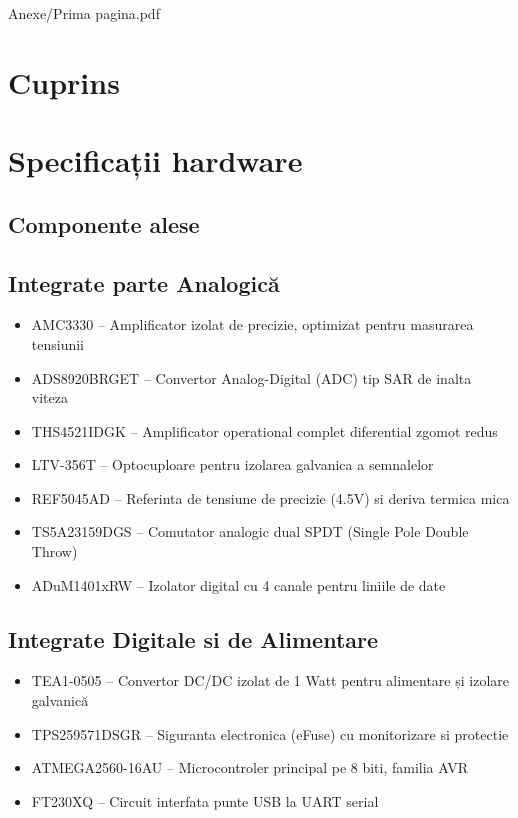 \documentclass[12pt,a4paper]{report}
\begin{document}
	

	 {Anexe/Prima pagina.pdf}

	
	\chapter*{Cuprins}
	\vspace{-8em}
	\tableofcontents
	\newpage
	
	\chapter {Specificații hardware}
	\section{Componente alese \\} 
	\section*{Integrate parte Analogică}
	\begin{itemize}
		\item AMC3330 -- Amplificator izolat de precizie, optimizat pentru masurarea tensiunii
		\item ADS8920BRGET -- Convertor Analog-Digital (ADC) tip SAR de inalta viteza
		\item THS4521IDGK -- Amplificator operational complet diferential  zgomot redus
		\item LTV-356T -- Optocuploare pentru izolarea galvanica a semnalelor
		\item REF5045AD -- Referinta de tensiune de precizie (4.5V) si deriva termica mica
		\item TS5A23159DGS -- Comutator analogic dual SPDT (Single Pole Double Throw)
		\item ADuM1401xRW -- Izolator digital cu 4 canale pentru liniile de date
	\end{itemize}
	
	\section*{Integrate Digitale si de Alimentare}
	\begin{itemize}
		\item TEA1-0505 -- Convertor DC/DC izolat de 1 Watt pentru alimentare și izolare galvanică
		\item TPS259571DSGR -- Siguranta electronica (eFuse) cu monitorizare si protectie
		\item ATMEGA2560-16AU -- Microcontroler principal pe 8 biti, familia AVR
		\item FT230XQ -- Circuit interfata punte USB la UART serial
		
	\end{itemize}
\end{document}
